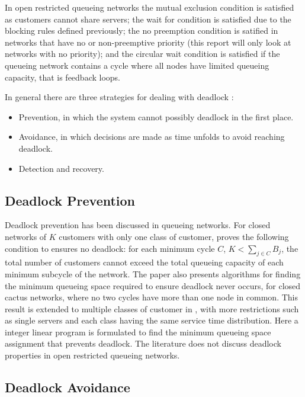 \documentclass{article}
\begin{document}
In open restricted queueing networks the mutual exclusion condition is satisfied as customers cannot share servers; the wait for condition is satisfied due to the blocking rules defined previously; the no preemption condition is satified in networks that have no or non-preemptive priority (this report will only look at networks with no priority); and the circular wait condition is satisfied if the queueing network contains a cycle where all nodes have limited queueing capacity, that is feedback loops.

In general there are three strategies for dealing with deadlock \cite{kawadkaretal14, elmagarmid86}:

\begin{itemize}
  \item Prevention, in which the system cannot possibly deadlock in the first place.
  \item Avoidance, in which decisions are made as time unfolds to avoid reaching deadlock.
  \item Detection and recovery.
\end{itemize}

\subsection{Deadlock Prevention}

Deadlock prevention has been discussed in queueing networks.
For closed networks of $K$ customers with only one class of customer, \cite{kunduakyildiz89} proves the following condition to ensures no deadlock: for each minimum cycle $C$, $K < \sum_{j\in C} B_j$, the total number of customers cannot exceed the total queueing capacity of each minimum subcycle of the network.
The paper also presents algorithms for finding the minimum queueing space required to ensure deadlock never occurs, for closed cactus networks, where no two cycles have more than one node in common.
This result is extended to multiple classes of customer in \cite{liebeherrakyildiz95}, with more restrictions such as single servers and each class having the same service time distribution.
Here a integer linear program is formulated to find the minimum queueing space assignment that prevents deadlock.
The literature does not discuss deadlock properties in open restricted queueing networks.

\subsection{Deadlock Avoidance}
\end{document}
